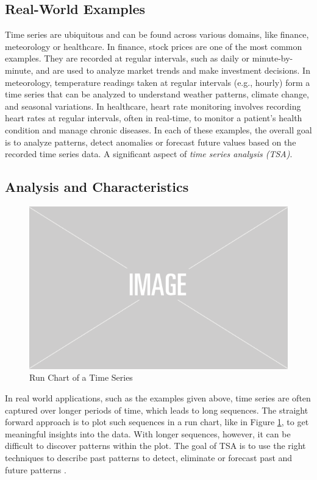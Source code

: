 \subsection{Real-World Examples}
Time series are ubiquitous and can be found across various domains, like finance, meteorology or healthcare. 
In finance, stock prices are one of the most common examples. They are recorded at regular intervals, such as daily or minute-by-minute, and are used to analyze market trends and make investment decisions. 
In meteorology, temperature readings taken at regular intervals (e.g., hourly) form a time series that can be analyzed to understand weather patterns, climate change, and seasonal variations. 
In healthcare, heart rate monitoring involves recording heart rates at regular intervals, often in real-time, to monitor a patient’s health condition and manage chronic diseases. 
In each of these examples, the overall goal is to analyze patterns, detect anomalies or forecast future values based on the recorded time series data. A significant aspect of \textit{time series analysis (TSA)}.


\subsection{Analysis and Characteristics}

\begin{figure}
    \centering
    \includegraphics[width=0.5\linewidth]{images/placeholder.png}
    \caption{Run Chart of a Time Series}
    \label{fig:run_chart_example}
\end{figure}

In real world applications, such as the examples given above, time series are often captured over longer periods of time, which leads to long sequences. The straight forward approach is to plot such sequences in a run chart, like in Figure \ref{fig:run_chart_example}, to get meaningful insights into the data. With longer sequences, however, it can be difficult to discover patterns within the plot. The goal of TSA is to use the right techniques to describe past patterns to detect, eliminate or forecast past and future patterns \cite{Vishwas2020}. 

